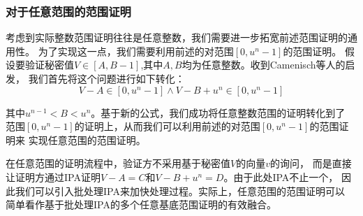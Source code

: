 \documentclass[zihao=-4]{ctexart}
\begin{document}
\subsubsection{对于任意范围的范围证明}
考虑到实际整数范围证明往往是任意整数，我们需要进一步拓宽前述范围证明的通用性。
为了实现这一点，我们需要利用前述的对范围$[0,u^n-1]$的范围证明。
假设要验证秘密值$V\in[A,B-1]$,其中$A,B$均为任意整数。收到Camenisch\cite{twelve}等人的启发，
我们首先将这个问题进行如下转化：
\begin{equation}V-A\in [0,u^n-1]\wedge V-B+u^n\in [0,u^n-1]\end{equation}\par
其中$u^{n-1}<B<u^n$。基于新的公式，我们成功将任意整数范围的证明转化到了
范围$[0,u^n-1]$的证明上，从而我们可以利用前述的对范围$[0,u^n-1]$的范围证明来
实现任意范围的范围证明。\par
在任意范围的证明流程中，验证方不采用基于秘密值$V$的向量$v$的询问，
而是直接让证明方通过IPA证明$V-A=C$和$V-B+u^n=D$。由于此处IPA不止一个，
因此我们可以引入批处理IPA来加快处理过程。实际上，任意范围的范围证明可以
简单看作基于批处理IPA的多个任意基底范围证明的有效融合。
\end{document}
